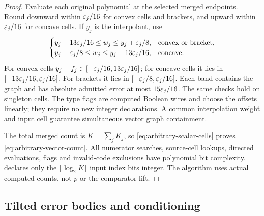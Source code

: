 \begin{proof}
Evaluate each original polynomial at the selected merged endpoints.
Round downward within $\varepsilon_j/16$ for convex cells and brackets,
and upward within $\varepsilon_j/16$ for concave cells. If $y_j$ is the
interpolant, use
\begin{equation}\label{eq:signed-overlay-bands}
 \begin{cases}
 y_j-13\varepsilon_j/16\le w_j\le y_j+\varepsilon_j/8,
       &\text{convex or bracket},\\
 y_j-\varepsilon_j/8\le w_j\le y_j+13\varepsilon_j/16,
       &\text{concave}.
 \end{cases}
\end{equation}
For convex cells $y_j-f_j\in[-\varepsilon_j/16,13\varepsilon_j/16]$;
for concave cells it lies in $[-13\varepsilon_j/16,\varepsilon_j/16]$.
For brackets it lies in $[-\varepsilon_j/8,\varepsilon_j/16]$.
Each band contains the graph and has absolute admitted error at most
$15\varepsilon_j/16$. The same checks hold on singleton cells. The type
flags are computed Boolean wires and choose the offsets linearly;
they require no new integer declarations. A common interpolation weight
and input cell guarantee simultaneous vector graph containment.

The total merged count is $K=\sum_jK_j$, so
\eqref{eq:arbitrary-scalar-cells} proves
\eqref{eq:arbitrary-vector-count}. All numerator searches, source-cell
lookups, directed evaluations, flags and invalid-code exclusions have
polynomial bit complexity.  declares only
the $\lceil\log_2K\rceil$ input index bits integer. The algorithm
uses actual computed counts, not $p$ or the comparator lift.
\end{proof}

\subsection{Tilted error bodies and conditioning}

